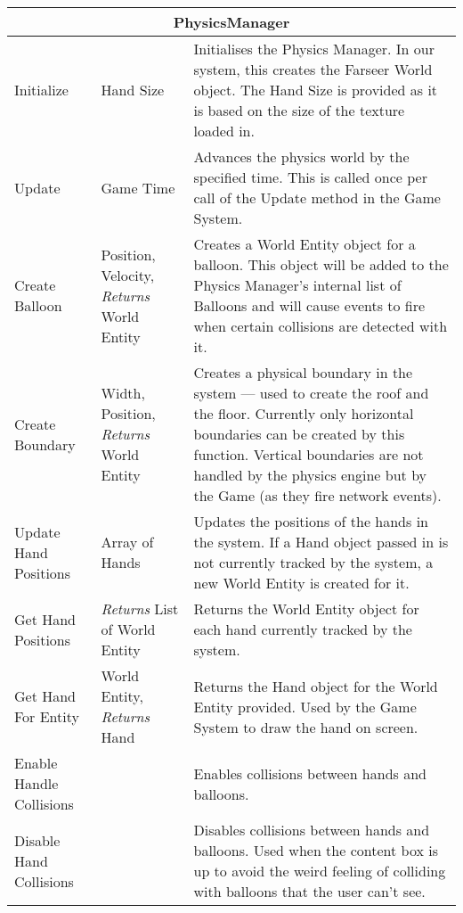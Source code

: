 \begin{table}[H]
\begin{tabular}{|p{5cm}|p{3cm}|p{10cm}|}
\hline
\multicolumn{3}{|c|}{PhysicsManager} \\ \hline

Initialize & Hand Size &
Initialises the Physics Manager. In our system, this creates the Farseer World
object. The Hand Size is provided as it is based on the size of the texture 
loaded in. \\ \hline

Update & Game Time &
Advances the physics world by the specified time. This is called once per call
of the Update method in the Game System.\\ \hline

Create Balloon & Position, Velocity, \emph{Returns} World Entity &
Creates a World Entity object for a balloon. This object will be added to the 
Physics Manager's internal list of Balloons and will cause events to fire when
certain collisions are detected with it.\\ \hline

Create Boundary & Width, Position, \emph{Returns} World Entity &
Creates a physical boundary in the system --- used to create the roof and the 
floor. Currently only horizontal boundaries can be created by this function.
Vertical boundaries are not handled by the physics engine but by the Game (as 
they fire network events).\\ \hline

Update Hand Positions & Array of Hands &
Updates the positions of the hands in the system. If a Hand object passed in 
is not currently tracked by the system, a new World Entity is created for it.
\\ \hline

Get Hand Positions & \emph{Returns} List of World Entity &
Returns the World Entity object for each hand currently tracked by the system.
\\ \hline

Get Hand For Entity & World Entity, \emph{Returns} Hand &
Returns the Hand object for the World Entity provided. Used by the Game System
to draw the hand on screen. \\ \hline

Enable Handle Collisions & &
Enables collisions between hands and balloons. \\ \hline

Disable Hand Collisions & &
Disables collisions between hands and balloons. Used when the content box is 
up to avoid the weird feeling of colliding with balloons that the user can't 
see. \\ \hline


\end{tabular}
\end{table}
